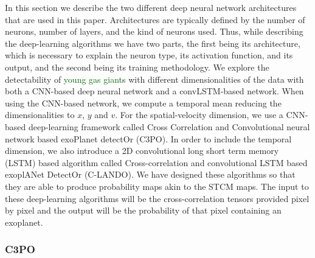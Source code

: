 \documentclass[referee]{aa} %
\newcommand{\newchange}[1]{\textcolor{darkgreen}{#1}}
\begin{document}
In this section we describe the two different deep neural network architectures that are used in this paper.
Architectures are typically defined by the number of neurons, number of layers, and the kind of neurons used.
Thus, while describing the deep-learning algorithms we have two parts, the first being its architecture, which is necessary to explain the neuron type, its activation function, and its output, and the second being its training methodology.
We explore the detectability of \newchange{young gas giant}s with different dimensionalities of the data with both a CNN-based deep neural network and a convLSTM-based network.
When using the CNN-based network, we compute a temporal mean reducing the dimensionalities to $x$, $y$ and $v$.
For the spatial-velocity dimension, we use a CNN-based deep-learning framework called Cross Correlation and Convolutional neural network based exoPlanet detectOr (C3PO).
In order to include the temporal dimension, we also introduce a 2D convolutional long short term memory (LSTM) based algorithm called Cross-correlation and convolutional LSTM based exoplANet DetectOr (C-LANDO).
We have designed these algorithms so that they are able to produce probability maps akin to the STCM maps. 
The input to these deep-learning algorithms will be the cross-correlation tensors provided pixel by pixel and the output will be the probability of that pixel containing an exoplanet. %

\subsubsection{C3PO}
\end{document}
